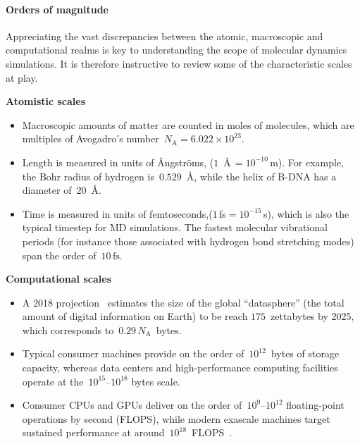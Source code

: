 \paragraph{Orders of magnitude}
{
Appreciating the vast discrepancies between the atomic, macroscopic and computational realms is key to understanding the scope of molecular dynamics simulations. It is therefore instructive to review some of the characteristic scales at play.

\noindent
\begin{minipage}[t]{0.48\textwidth}
\textbf{Atomistic scales}
\begin{itemize}
    \item Macroscopic amounts of matter are counted in moles of molecules, which are multiples of Avogadro's number~$N_{\mathrm{A}}=6.022\times 10^{23}$.
    \item Length is measured in units of {\AA ngstr\"oms}, ($1$~\AA$\,=10^{-10}\,\mathrm{m}$). For example, the Bohr radius of hydrogen is~$0.529$~\AA, while the helix of B-DNA has a diameter of~$20$~\AA.
    \item Time is measured in units of femtoseconds,($1$\,fs$=10^{-15}$\,s), which is also the typical timestep for MD simulations. The fastest molecular vibrational periods (for instance those associated with hydrogen bond stretching modes) span the order of~$10\,\mathrm{fs}$.
\end{itemize}
\end{minipage}\hfill
\begin{minipage}[t]{0.48\textwidth}
\textbf{Computational scales}
\begin{itemize}
  \item A 2018 projection~\cite{RGR18} estimates the size of the global ``datasphere'' (the total amount of digital information on Earth) to be reach $175$~zettabytes by 2025, which corresponds to~$0.29\,N_{\mathrm{A}}$~bytes.
  \item Typical consumer machines provide on the order of~$10^{12}$~bytes of storage capacity, whereas data centers and high-performance computing facilities operate at the~$10^{15}$--$10^{18}$ bytes scale.
  \item Consumer CPUs and GPUs deliver on the order of~$10^{9}$--$10^{12}$ floating-point operations by second (FLOPS), while modern exascale machines target sustained performance at around~$10^{18}$~FLOPS~\cite{Sc22}.
\end{itemize}
\end{minipage}
}
\newline\newline
